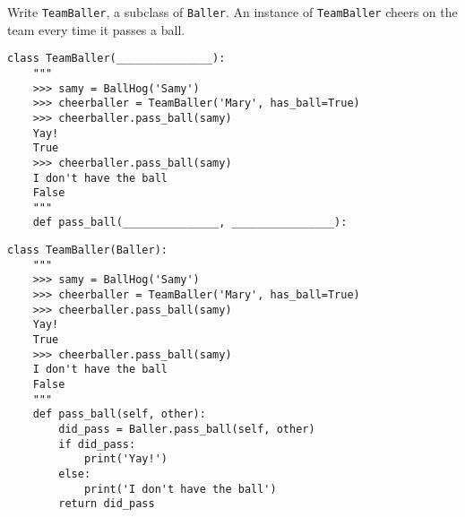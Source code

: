 \begin{blocksection}
\question Write \lstinline$TeamBaller$, a subclass of \lstinline$Baller$. An instance of \lstinline$TeamBaller$ cheers on the team every time it passes a ball.

\ifprintanswers\else
\begin{lstlisting}
class TeamBaller(_______________):
    """
    >>> samy = BallHog('Samy')
    >>> cheerballer = TeamBaller('Mary', has_ball=True)
    >>> cheerballer.pass_ball(samy)
    Yay!
    True
    >>> cheerballer.pass_ball(samy)
    I don't have the ball
    False
    """
    def pass_ball(_______________, ________________):
\end{lstlisting}
\fi

\begin{solution}[1in]
\begin{lstlisting}
class TeamBaller(Baller):
    """
    >>> samy = BallHog('Samy')
    >>> cheerballer = TeamBaller('Mary', has_ball=True)
    >>> cheerballer.pass_ball(samy)
    Yay!
    True
    >>> cheerballer.pass_ball(samy)
    I don't have the ball
    False
    """
    def pass_ball(self, other):
        did_pass = Baller.pass_ball(self, other)
        if did_pass:
            print('Yay!')
        else:
            print('I don't have the ball')
        return did_pass
\end{lstlisting}
\end{solution}
\end{blocksection}

